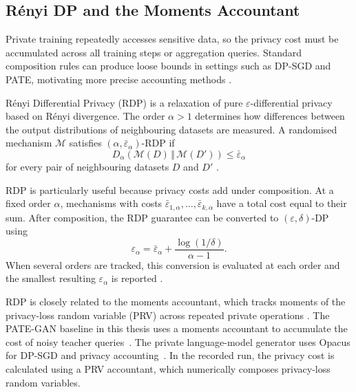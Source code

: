 \subsection{Rényi DP and the Moments Accountant}
\label{sec:bg:dp:rdp}

Private training repeatedly accesses sensitive data, so the privacy cost
must be accumulated across all training steps or aggregation queries.
Standard composition rules can produce loose bounds in settings such as
DP-SGD and PATE, motivating more precise accounting methods
\cite{Abadi2016DPSGD,Papernot2017PATE}.

Rényi Differential Privacy (RDP) is a relaxation of pure
$\varepsilon$-differential privacy based on Rényi divergence. The order
$\alpha>1$ determines how differences between the output distributions
of neighbouring datasets are measured. A randomised mechanism
$\mathcal{M}$ satisfies $(\alpha,\bar{\varepsilon}_{\alpha})$-RDP if
\begin{equation}
\label{eq:bg:dp:rdp}
D_{\alpha}\!\left(
  \mathcal{M}(D)\,\Vert\,\mathcal{M}(D')
\right)
\leq \bar{\varepsilon}_{\alpha}
\end{equation}
for every pair of neighbouring datasets $D$ and $D'$
\cite{Mironov2017RDP}.

RDP is particularly useful because privacy costs add under composition.
At a fixed order $\alpha$, mechanisms with costs
$\bar{\varepsilon}_{1,\alpha},\ldots,
\bar{\varepsilon}_{k,\alpha}$ have a total cost equal to their sum.
After composition, the RDP guarantee can be converted to
$(\varepsilon,\delta)$-DP using
\begin{equation}
\label{eq:bg:dp:conv}
\varepsilon_{\alpha}
=
\bar{\varepsilon}_{\alpha}
+
\frac{\log(1/\delta)}{\alpha-1}.
\end{equation}
When several orders are tracked, this conversion is evaluated at each
order and the smallest resulting $\varepsilon_{\alpha}$ is reported
\cite{Mironov2017RDP}.

RDP is closely related to the moments accountant, which tracks moments
of the privacy-loss random variable (PRV) across repeated private operations
\cite{Abadi2016DPSGD,Mironov2017RDP}. The PATE-GAN baseline in this
thesis uses a moments accountant to accumulate the cost of noisy teacher
queries~\cite{pategan}. The private language-model generator uses Opacus
for DP-SGD and privacy accounting~\cite{Yousefpour2021Opacus}. In the recorded run, the privacy
cost is calculated using a PRV accountant, which numerically composes
privacy-loss random variables.


